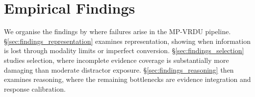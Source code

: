



\section{Empirical Findings}
\label{sec:emp_findings}

We organise the findings by where failures arise in the MP-VRDU pipeline. \S\ref{sec:findings_representation} examines representation, showing when information is lost through modality limits or imperfect conversion. \S\ref{sec:findings_selection} studies selection, where incomplete evidence coverage is substantially more damaging than moderate distractor exposure. \S\ref{sec:findings_reasoning} then examines reasoning, where the remaining bottlenecks are evidence integration and response calibration.


